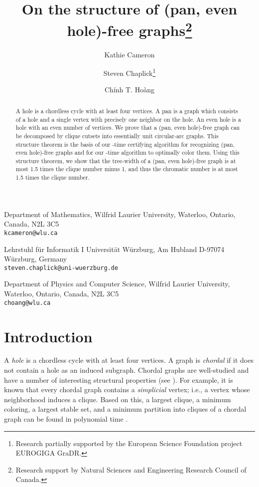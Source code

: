 \documentclass[11pt,a4paper]{article}
\def\inst#1{}
\begin{document}
\title{On the structure of (pan, even hole)-free graphs\thanks{Research
support by Natural Sciences and Engineering Research Council of
Canada.}}
\author{Kathie Cameron\inst{1}
 \and Steven Chaplick\inst{2}\thanks{Research partially supported by the European Science Foundation project EUROGIGA GraDR.}
  \and Ch\'inh T. Ho\`ang\inst{3}
}
\date{}
\maketitle
\begin{center}
{\footnotesize

\inst{1} Department of Mathematics, Wilfrid Laurier University,
Waterloo, Ontario,  Canada, N2L 3C5\\
\texttt{kcameron@wlu.ca}

\inst{2} Lehrstuhl f\"ur Informatik I
Universit\"at W\"urzburg, Am Hubland
D-97074 W\"urzburg, Germany\\
\texttt{steven.chaplick@uni-wuerzburg.de}

\inst{3} Department of Physics and Computer Science, Wilfrid
Laurier University,
Waterloo, Ontario,  Canada, N2L 3C5\\
\texttt{choang@wlu.ca} }

\end{center}

\begin{abstract}
A hole is a chordless  cycle with at least four vertices. A pan is
a graph which consists of a hole and a single vertex with
precisely one neighbor on the hole. An even hole is a hole with
an even number of vertices. We prove that a (pan, even hole)-free
graph can be decomposed by  clique cutsets into essentially unit
circular-arc graphs. This structure theorem is the basis of our
-time certifying algorithm for recognizing (pan, even
hole)-free graphs and for our -time algorithm to optimally
color them. Using this structure theorem, we show that the tree-width
of a (pan, even hole)-free graph is at most 1.5 times the clique
number minus 1, and thus the chromatic number is at most 1.5 times the
clique number.
\end{abstract}

\section{Introduction}\label{sec:introduction}
A {\em hole} is a chordless cycle with at least four vertices. A
graph is  {\em chordal} if it does not contain a hole as an
induced subgraph. Chordal graphs are well-studied and have a
number of interesting structural properties (see
\cite{BerChv1984,Gol1980}). For example, it is known
\cite{Dir1961} that every chordal graph contains a {\it
simplicial} vertex; i.e., a vertex whose neighborhood induces a
clique. Based on this, a largest clique, a minimum coloring, a
largest stable set, and a minimum partition into cliques of a
chordal graph can be found in polynomial time \cite{Gavril1972}.
\end{document}

